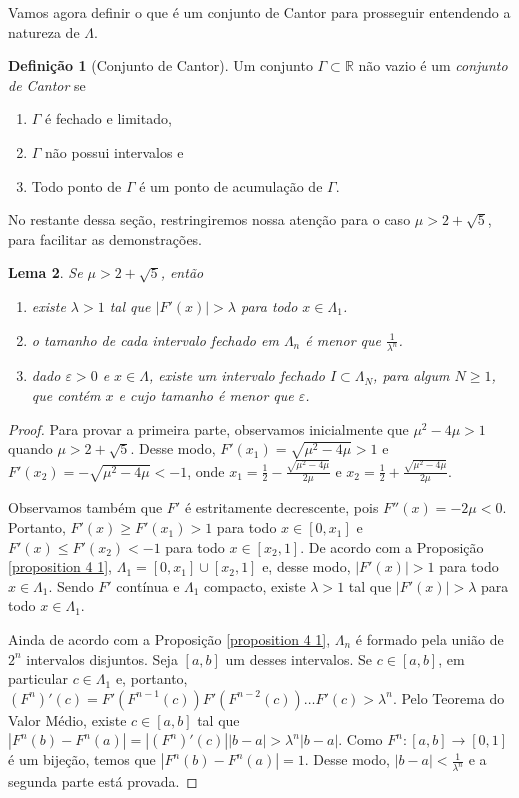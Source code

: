 \documentclass[a4paper, 12pt]{article}
\theoremstyle{definition}
\newtheorem{definition}{Definição}[section]
\theoremstyle{plain}
\theoremstyle{plain}
\newtheorem{lemma}[definition]{Lema}
\theoremstyle{plain}
\theoremstyle{remark}
\newcommand{\RR}{\mathbb{R}}
\begin{document}
Vamos agora definir o que é um conjunto de Cantor para prosseguir entendendo a natureza de $\Lambda$.

\begin{definition}[Conjunto de Cantor]
Um conjunto $\Gamma \subset \RR$ não vazio é um \textit{conjunto de Cantor} se
\begin{enumerate}
\item $\Gamma$ é fechado e limitado,
\item $\Gamma$ não possui intervalos e
\item Todo ponto de $\Gamma$ é um ponto de acumulação de $\Gamma$.
\end{enumerate}
\end{definition}

No restante dessa seção, restringiremos nossa atenção para o caso $\mu > 2 + \sqrt{5}$, para facilitar as demonstrações.

\begin{lemma}
\label{lemma 4 1}
Se $\mu > 2 + \sqrt{5}$, então
\begin{enumerate}
\item  existe $\lambda > 1$ tal que $|F'(x)| > \lambda$ para todo $x \in \Lambda_1$.
\item o tamanho de cada intervalo fechado em $\Lambda_n$ é menor que $\frac{1}{\lambda^n}$.
\item dado $\varepsilon > 0$ e $x \in \Lambda$, existe um intervalo fechado $I \subset \Lambda_N$, para algum $N \geq 1$,  que contém $x$ e cujo tamanho é menor que $\varepsilon$.
\end{enumerate}
\end{lemma}

\begin{proof}
Para provar a primeira parte, observamos inicialmente que $\mu^2 - 4\mu > 1$ quando $\mu > 2 + \sqrt{5}$. Desse modo, $F'(x_1) = \sqrt{\mu^2 - 4\mu} > 1$ e $F'(x_2) = -\sqrt{\mu^2 - 4\mu} < -1$, onde $x_1 = \frac{1}{2} - \frac{\sqrt{\mu^2 - 4\mu}}{2\mu}$ e $x_2 = \frac{1}{2} + \frac{\sqrt{\mu^2 - 4\mu}}{2\mu}$.

Observamos também que $F'$ é estritamente decrescente, pois $F''(x) = -2\mu < 0$.  Portanto, $F'(x) \geq F'(x_1) > 1$ para todo $x \in [0, x_1]$ e $F'(x) \leq F'(x_2) < -1$ para todo $x \in [x_2, 1]$. De acordo com a Proposição \ref{proposition 4 1}, $\Lambda_1 = [0, x_1] \cup [x_2, 1]$ e, desse modo, $|F'(x)| > 1$ para todo $x \in \Lambda_1$. Sendo $F'$ contínua e $\Lambda_1$ compacto, existe $\lambda > 1$ tal que $|F'(x)| > \lambda$ para todo $x \in \Lambda_1$.

Ainda de acordo com a Proposição \ref{proposition 4 1}, $\Lambda_n$ é formado pela união de $2^n$ intervalos disjuntos. Seja $[a, b]$ um desses intervalos. Se $c \in [a, b]$, em particular $c \in \Lambda_1$ e, portanto, $(F^n)'(c) = F'(F^{n-1}(c)) F'(F^{n-2}(c)) \dots F'(c) > \lambda^n$. Pelo Teorema do Valor Médio, existe $c \in [a, b]$ tal que $|F^n(b) - F^n(a)| = |(F^n)'(c)||b - a| > \lambda^n|b - a|$. Como $F^n: [a, b] \rightarrow [0 ,1]$ é um bijeção, temos que $|F^n(b) - F^n(a)| = 1$. Desse modo, $|b - a| < \frac{1}{\lambda^n}$ e a segunda parte está provada.
\end{proof} 
\end{document}
